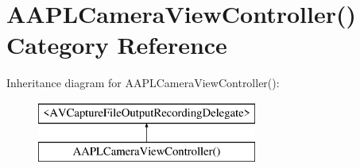 \hypertarget{category_a_a_p_l_camera_view_controller_07_08}{}\section{A\+A\+P\+L\+Camera\+View\+Controller() Category Reference}
\label{category_a_a_p_l_camera_view_controller_07_08}
Inheritance diagram for A\+A\+P\+L\+Camera\+View\+Controller()\+:\begin{figure}[H]
\begin{center}
\leavevmode
\includegraphics[height=2.000000cm]{category_a_a_p_l_camera_view_controller_07_08}
\end{center}
\end{figure}
